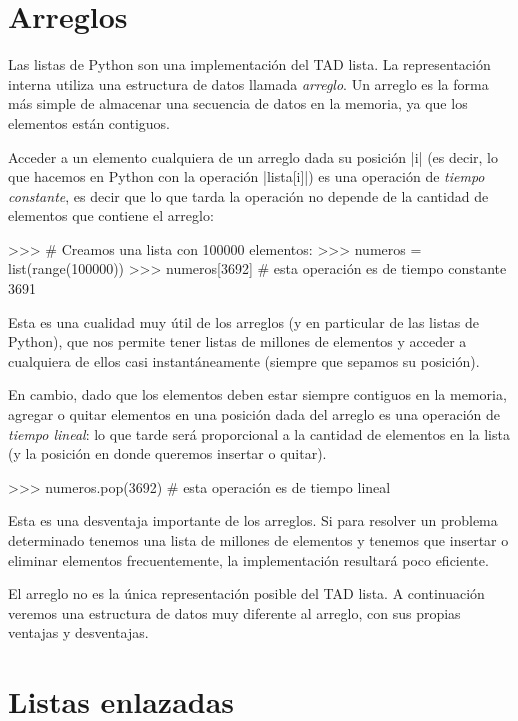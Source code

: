 \section{Arreglos}

Las listas de Python son una implementación del TAD lista. La representación
interna utiliza una estructura de datos llamada \emph{arreglo}.
Un arreglo es la forma más simple de almacenar una secuencia de datos en la
memoria, ya que los elementos están contiguos.

Acceder a un elemento cualquiera de un arreglo dada su posición |i|
(es decir, lo que hacemos en Python con la operación |lista[i]|) es una
operación de \emph{tiempo constante}, es decir que lo que tarda la
operación no depende de la cantidad de elementos que contiene el arreglo:

\begin{codigo-python-sn}
>>> # Creamos una lista con 100000 elementos:
>>> numeros = list(range(100000))
>>> numeros[3692] # esta operación es de tiempo constante
3691
\end{codigo-python-sn}

Esta es una cualidad muy útil de los arreglos (y en particular de
las listas de Python), que nos permite tener listas de millones de elementos
y acceder a cualquiera de ellos casi instantáneamente (siempre que sepamos su
posición).

En cambio, dado que los elementos deben estar siempre contiguos en la memoria,
agregar o quitar elementos en una posición dada del arreglo es una operación de
\emph{tiempo lineal}: lo que tarde será proporcional a la cantidad de elementos
en la lista (y la posición en donde queremos insertar o quitar).

\begin{codigo-python-sn}
>>> numeros.pop(3692) # esta operación es de tiempo lineal
\end{codigo-python-sn}

Esta es una desventaja importante de los arreglos. Si para resolver un problema
determinado tenemos una lista de millones de elementos y tenemos que insertar
o eliminar elementos frecuentemente, la implementación resultará poco
eficiente.

El arreglo no es la única representación posible del TAD lista. A continuación
veremos una estructura de datos muy diferente al arreglo, con sus propias
ventajas y desventajas.

\section{Listas enlazadas}

